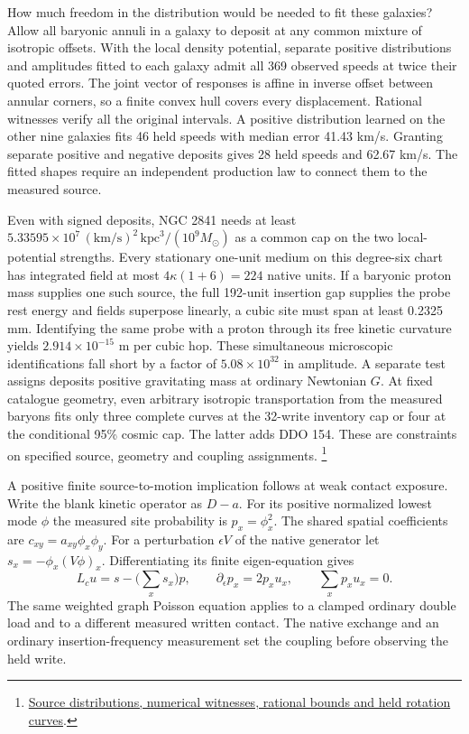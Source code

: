 \documentclass[11pt]{article}
\begin{document}
How much freedom in the distribution would be needed to fit these
galaxies? Allow all baryonic annuli in a galaxy to deposit at any common
mixture of isotropic offsets. With the local density potential, separate
positive distributions and amplitudes fitted to each galaxy admit
all 369 observed speeds at twice their quoted errors. The joint vector
of responses is affine in inverse offset between annular corners, so
a finite convex hull covers every displacement. Rational witnesses
verify all the original intervals. A positive distribution learned on
the other nine galaxies fits 46 held speeds with median error 41.43 km/s.
Granting separate positive and negative deposits gives 28 held speeds
and 62.67 km/s. The fitted shapes require an independent production law
to connect them to the measured source.

Even with signed deposits, NGC 2841 needs at least
$5.33595\times10^7\,(\mathrm{km/s})^2\,\mathrm{kpc}^3/(10^9 M_\odot)$
as a common cap on the two local-potential strengths. Every stationary one-unit
medium on this degree-six chart has integrated field at most
$4\kappa(1+6)=224$ native units. If a baryonic proton mass supplies
one such source, the full 192-unit insertion gap supplies the probe
rest energy and fields superpose linearly, a cubic site must span at
least 0.2325 mm. Identifying the same probe with a proton through its
free kinetic curvature yields $2.914\times10^{-15}$ m per cubic hop.
These simultaneous microscopic identifications fall short by a factor
of $5.08\times10^{32}$ in amplitude. A separate test assigns deposits
positive gravitating mass at ordinary Newtonian $G$. At fixed catalogue
geometry, even arbitrary isotropic transportation from the measured
baryons fits only three complete curves at the 32-write inventory cap
or four at the conditional 95\% cosmic cap. The latter adds DDO 154.
These are constraints on specified source, geometry and coupling
assignments.%
\footnote{\href{https://github.com/FloatingPragma/observer-patch-holography/tree/main/code/cosmology/paid_trail_bao}{Source distributions, numerical witnesses, rational bounds and held rotation curves}.}

A positive finite source-to-motion implication follows at weak contact
exposure. Write the blank kinetic operator as $D-a$. For its positive
normalized lowest mode $\phi$ the measured site probability is
$p_x=\phi_x^2$. The shared spatial coefficients are
$c_{xy}=a_{xy}\phi_x\phi_y$. For a perturbation $\epsilon V$ of the
native generator let $s_x=-\phi_x(V\phi)_x$. Differentiating its finite
eigen-equation gives
\[
     L_c u=s-\Big(\sum_xs_x\Big)p,\qquad
     \partial_\epsilon p_x=2p_xu_x,\qquad \sum_xp_xu_x=0 .
\]
The same weighted graph Poisson equation applies to a clamped ordinary
double load and to a different measured written contact. The native
exchange and an ordinary insertion-frequency measurement set the
coupling before observing the held write.
\end{document}
